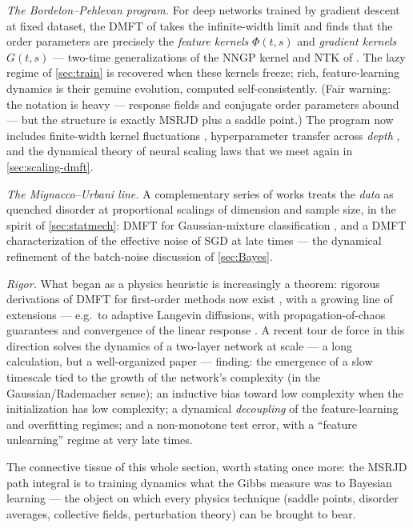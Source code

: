 \documentclass[11pt]{article}
\begin{document}
\emph{The Bordelon--Pehlevan program.} For deep networks trained by gradient descent at fixed dataset, the DMFT of \cite{bordelon2022self} takes the infinite-width limit and finds that the order parameters are precisely the \emph{feature kernels} $\Phi(t,s)$ and \emph{gradient kernels} $G(t,s)$ --- two-time generalizations of the NNGP kernel and NTK of . The lazy regime of \cref{sec:train} is recovered when these kernels freeze; rich, feature-learning dynamics is their genuine evolution, computed self-consistently. (Fair warning: the notation is heavy --- response fields and conjugate order parameters abound --- but the structure is exactly MSRJD plus a saddle point.) The program now includes finite-width kernel fluctuations \cite{bordelonDynamicsFiniteWidth2023}, hyperparameter transfer across \emph{depth} \cite{bordelonDepthwiseHyperparameterTransfer2023}, and the dynamical theory of neural scaling laws \cite{bordelon2024dynamical} that we meet again in \cref{sec:scaling-dmft}.

\emph{The Mignacco--Urbani line.} A complementary series of works treats the \emph{data} as quenched disorder at proportional scalings of dimension and sample size, in the spirit of \cref{sec:statmech}: DMFT for Gaussian-mixture classification \cite{mignaccoDynamicalMeanfieldTheory2021}, and a DMFT characterization of the effective noise of SGD at late times \cite{mignaccoEffectiveNoiseStochastic2022} --- the dynamical refinement of the batch-noise discussion of \cref{sec:Bayes}.

\emph{Rigor.} What began as a physics heuristic is increasingly a theorem: rigorous derivations of DMFT for first-order methods now exist \cite{celentano2021high,gerbelot2024rigorous}, with a growing line of extensions --- e.g.\ to adaptive Langevin diffusions, with propagation-of-chaos guarantees and convergence of the linear response \cite{fan2025adaptive}. A recent tour de force in this direction \cite{montanariDynamicalDecouplingGeneralization2025} solves the dynamics of a two-layer network at scale --- a long calculation, but a well-organized paper --- finding: the emergence of a slow timescale tied to the growth of the network's complexity (in the Gaussian/Rademacher sense); an inductive bias toward low complexity when the initialization has low complexity; a dynamical \emph{decoupling} of the feature-learning and overfitting regimes; and a non-monotone test error, with a ``feature unlearning'' regime at very late times.

The connective tissue of this whole section, worth stating once more: the MSRJD path integral is to training dynamics what the Gibbs measure was to Bayesian learning --- the object on which every physics technique (saddle points, disorder averages, collective fields, perturbation theory) can be brought to bear.
\end{document}
